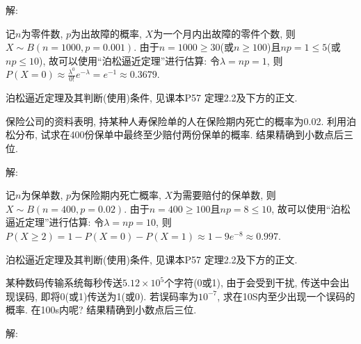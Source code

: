 \documentclass[standard]{ExBook}
\begin{document}
\begin{qitems}
    \begin{bbox}
解: 

记$n$为零件数, $p$为出故障的概率, $X$为一个月内出故障的零件个数, 则$X\sim B(n=1000,p=0.001)$. 由于$n=1000\geq30$(或$n\geq100$)且$np=1 \leq 5$(或$np \leq 10$), 故可以使用``泊松逼近定理''进行估算: 令$\lambda=np=1$, 则$P(X=0)\approx\frac{\lambda^{0}}{0!}e^{-\lambda}=e^{-1}\approx0.3679$.

\textcolor{themeColor}{\selectfont {} 泊松逼近定理及其判断(使用)条件, 见课本P57 定理2.2及下方的正文.}
    \end{bbox}

\vspace{-5em}

    \begin{bbox}
    \begin{shaded}
        \qitem
保险公司的资料表明, 持某种人寿保险单的人在保险期内死亡的概率为0.02. 利用泊松分布, 试求在400份保单中最终至少赔付两份保单的概率. 结果精确到小数点后三位.
    \end{shaded}
    \end{bbox}

\vspace{-5em}

    \begin{bbox}
解: 

记$n$为保单数, $p$为保险期内死亡概率, $X$为需要赔付的保单数, 则$X\sim B(n=400,p=0.02)$. 由于$n=400\geq100$且$np=8 \leq 10$, 故可以使用``泊松逼近定理''进行估算: 令$\lambda=np=10$, 则$P(X \geq 2)=1-P(X=0)-P(X=1)\approx1-9e^{-8}\approx0.997$.

\textcolor{themeColor}{\selectfont {} 泊松逼近定理及其判断(使用)条件, 见课本P57 定理2.2及下方的正文.}
    \end{bbox}

\vspace{-5em}

    \begin{bbox}
    \begin{shaded}
        \qitem
某种数码传输系统每秒传送$5.12\times10^5$个字符(0或1), 由于会受到干扰, 传送中会出现误码, 即将0(或1)传送为1(或0). 若误码率为$10^{-7}$, 求在10S内至少出现一个误码的概率. 在100s内呢? 结果精确到小数点后三位.
    \end{shaded}
    \end{bbox}

\vspace{-5em}

    \begin{bbox}
解: 


\end{bbox}
\end{qitems}
\end{document}
